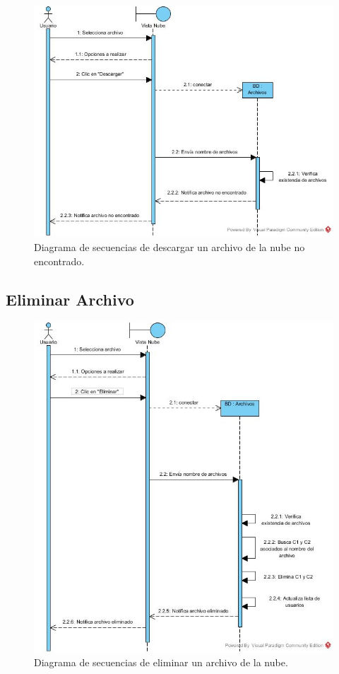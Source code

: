 \begin{figure}[htbp!]
		\centering
			\includegraphics[width=1\textwidth]{images/Descargar_aleternativa_a}
		\caption{Diagrama de secuencias de descargar un archivo de la nube no encontrado.}
\end{figure} 
\newpage

\subsection{Eliminar Archivo}

\begin{figure}[htbp!]
		\centering
			\includegraphics[width=1\textwidth]{images/Eliminar_Archivo}
		\caption{Diagrama de secuencias de eliminar un archivo de la nube.}
\end{figure} 
\newpage

